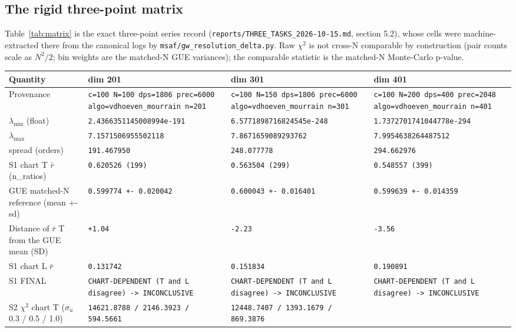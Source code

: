 \documentclass[11pt]{article}
\begin{document}
\subsection{The rigid three-point matrix}
Table~\ref{tab:matrix} is the exact three-point series record
(\texttt{reports/THREE\_TASKS\_2026-10-15.md}, section 5.2), whose cells
were machine-extracted there from the canonical logs by
\texttt{msaf/gw\_resolution\_delta.py}. Raw $\chi^2$ is not cross-N
comparable by construction (pair counts scale as $N^{2}/2$; bin weights
are the matched-N GUE variances); the comparable statistic is the
matched-N Monte-Carlo p-value.

\begin{table}[htbp]\centering\small
\begin{tabular}{@{}l p{3.4cm} p{3.4cm} p{3.4cm}@{}}
\toprule
Quantity & dim 201 & dim 301 & dim 401 \\
\midrule
Provenance & \texttt{c=100 N=100 dps=1806 prec=6000 algo=vdhoeven\_mourrain n=201} &
\texttt{c=100 N=150 dps=1806 prec=6000 algo=vdhoeven\_mourrain n=301} &
\texttt{c=100 N=200 dps=400 prec=2048 algo=vdhoeven\_mourrain n=401} \\
$\lambda_{\min}$ (float) & \texttt{2.4366351145008994e-191} &
\texttt{6.5771898716824545e-248} & \texttt{1.7372701741044778e-294} \\
$\lambda_{\max}$ & \texttt{7.1571506955502118} &
\texttt{7.8671659089293762} & \texttt{7.9954638264487512} \\
spread (orders) & \texttt{191.467950} & \texttt{248.077778} &
\texttt{294.662976} \\
S1 chart T $\bar r$ (n\_ratios) & \texttt{0.620526 (199)} &
\texttt{0.563504 (299)} & \texttt{0.548557 (399)} \\
GUE matched-N reference (mean +- sd) & \texttt{0.599774 +- 0.020042} &
\texttt{0.600043 +- 0.016401} & \texttt{0.599639 +- 0.014359} \\
Distance of $\bar r$ T from the GUE mean (SD) & \texttt{+1.04} &
\texttt{-2.23} & \texttt{-3.56} \\
S1 chart L $\bar r$ & \texttt{0.131742} & \texttt{0.151834} &
\texttt{0.190891} \\
S1 FINAL & \texttt{CHART-DEPENDENT (T and L disagree) -> INCONCLUSIVE} &
\texttt{CHART-DEPENDENT (T and L disagree) -> INCONCLUSIVE} &
\texttt{CHART-DEPENDENT (T and L disagree) -> INCONCLUSIVE} \\
S2 $\chi^2$ chart T ($\sigma_u$ 0.3 / 0.5 / 1.0) &
\texttt{14621.8788 / 2146.3923 / 594.5661} &
\texttt{12448.7407 / 1393.1679 / 869.3876} &

\end{tabular}
\end{table}
\end{document}
